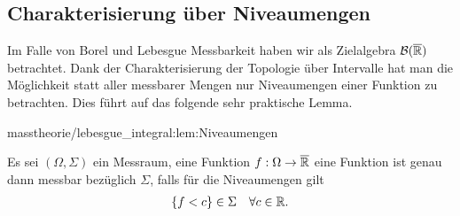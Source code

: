 \subsection{Charakterisierung über Niveaumengen}
\label{\detokenize{masstheorie/lebesgue_integral:charakterisierung-uber-niveaumengen}}
\par
Im Falle von Borel und Lebesgue Messbarkeit haben wir als Zielalgebra \(\mathcal{B}(\overline{\mathbb{R}})\) betrachtet. Dank der Charakterisierung der Topologie über Intervalle hat man die Möglichkeit statt aller messbarer Mengen nur Niveaumengen einer Funktion zu betrachten. Dies führt auf das folgende sehr praktische Lemma.
\begin{lemma}{}{masstheorie/lebesgue_integral:lem:Niveaumengen}



\par
Es sei \((\Omega,\Sigma)\) ein Messraum, eine Funktion \(f:\Omega\to\overline{\mathbb{R}}\) eine Funktion ist genau dann messbar bezüglich \(\Sigma\), falls
für die Niveaumengen gilt
\begin{align*}
\{f< c\}\in\Sigma\quad\forall c\in\mathbb{R}.
\end{align*}\end{lemma}

